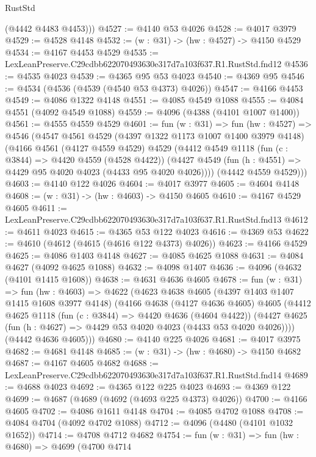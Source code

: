 \begin{lexlean}{RustStd}
\begin{coremodule}
        (@4442 @4483 @4453)))
@4527 := @4140 @53 @4026
@4528 := @4017 @3979
@4529 := @4528 @4148
@4532 := (w : @31) -> (hw : @4527) -> @4150 @4529
@4534 := @4167 @4453 @4529
@4535 := LexLeanPreserve.C29cdbb622070493630e317d7a103f637.R1.RustStd.fnd12
@4536 := @4535 @4023
@4539 := @4365 @95 @53 @4023
@4540 := @4369 @95
@4546 := @4534 (@4536 (@4539 (@4540 @53 @4373) @4026))
@4547 := @4166 @4453
@4549 := @4086 @1322 @4148
@4551 := @4085 @4549 @1088
@4555 := @4084 @4551 (@4092 @4549 @1088)
@4559 := @4096 (@4388 (@4101 @1007 @1400))
@4561 := @4555 @4559 @4529
@4601 := fun (w : @31) =>
  fun (hw : @4527) =>
  @4546
    (@4547
      @4561
      @4529
      (@4397 @1322 @1173 @1007 @1400 @3979 @4148)
      (@4166
        @4561
        (@4127 @4559 @4529)
        @4529
        (@4412
          @4549
          @1118
          (fun (c : @3844) => @4420 @4559 (@4528 @4422))
          (@4427 @4549 (fun (h : @4551) => @4429 @95 @4020 @4023 (@4433 @95 @4020 @4026))))
        (@4442 @4559 @4529)))
@4603 := @4140 @122 @4026
@4604 := @4017 @3977
@4605 := @4604 @4148
@4608 := (w : @31) -> (hw : @4603) -> @4150 @4605
@4610 := @4167 @4529 @4605
@4611 := LexLeanPreserve.C29cdbb622070493630e317d7a103f637.R1.RustStd.fnd13
@4612 := @4611 @4023
@4615 := @4365 @53 @122 @4023
@4616 := @4369 @53
@4622 := @4610 (@4612 (@4615 (@4616 @122 @4373) @4026))
@4623 := @4166 @4529
@4625 := @4086 @1403 @4148
@4627 := @4085 @4625 @1088
@4631 := @4084 @4627 (@4092 @4625 @1088)
@4632 := @4098 @1407
@4636 := @4096 (@4632 (@4101 @1415 @1608))
@4638 := @4631 @4636 @4605
@4678 := fun (w : @31) =>
  fun (hw : @4603) =>
  @4622
    (@4623
      @4638
      @4605
      (@4397 @1403 @1407 @1415 @1608 @3977 @4148)
      (@4166
        @4638
        (@4127 @4636 @4605)
        @4605
        (@4412
          @4625
          @1118
          (fun (c : @3844) => @4420 @4636 (@4604 @4422))
          (@4427 @4625 (fun (h : @4627) => @4429 @53 @4020 @4023 (@4433 @53 @4020 @4026))))
        (@4442 @4636 @4605)))
@4680 := @4140 @225 @4026
@4681 := @4017 @3975
@4682 := @4681 @4148
@4685 := (w : @31) -> (hw : @4680) -> @4150 @4682
@4687 := @4167 @4605 @4682
@4688 := LexLeanPreserve.C29cdbb622070493630e317d7a103f637.R1.RustStd.fnd14
@4689 := @4688 @4023
@4692 := @4365 @122 @225 @4023
@4693 := @4369 @122
@4699 := @4687 (@4689 (@4692 (@4693 @225 @4373) @4026))
@4700 := @4166 @4605
@4702 := @4086 @1611 @4148
@4704 := @4085 @4702 @1088
@4708 := @4084 @4704 (@4092 @4702 @1088)
@4712 := @4096 (@4480 (@4101 @1032 @1652))
@4714 := @4708 @4712 @4682
@4754 := fun (w : @31) =>
  fun (hw : @4680) =>
  @4699
    (@4700
      @4714

\end{coremodule}
\end{lexlean}
